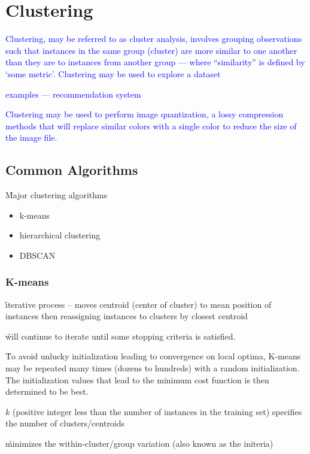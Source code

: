 \section{Clustering}

\textcolor{blue}{Clustering, may be referred to as cluster analysis, involves grouping observations such that instances in the same group (cluster) are more similar to one another than they are to instances from another group --- where ``similarity'' is defined by `some metric'. Clustering may be used to explore a dataset}

\textcolor{blue}{examples --- recommendation system}

\textcolor{blue}{Clustering may be used to perform {image quantization}, a lossy compression methods that will replace similar colors with a single color to reduce the size of the image file.}

\subsection{Common Algorithms}

\r{Major clustering algorithms}
\begin{itemize}[noitemsep,topsep=0pt]
	\item k-means
	\item hierarchical clustering
	\item DBSCAN
\end{itemize}

\subsubsection{K-means}

\r{iterative process -- moves centroid (center of cluster) to mean position of instances then reassigning instances to clusters by closest centroid}

\r{will continue to iterate until some stopping criteria is satisfied.}

\r{To avoid unlucky initialization leading to convergence on local optima, K-means may be repeated many times (dozens to hundreds) with a random initialization. The initialization values that lead to the minimum cost function is then determined to be best.}

\r{$k$ (positive integer less than the number of instances in the training set) specifies the number of clusters/centroids}

\r{minimizes the within-cluster/group variation (also known as the initeria)}

